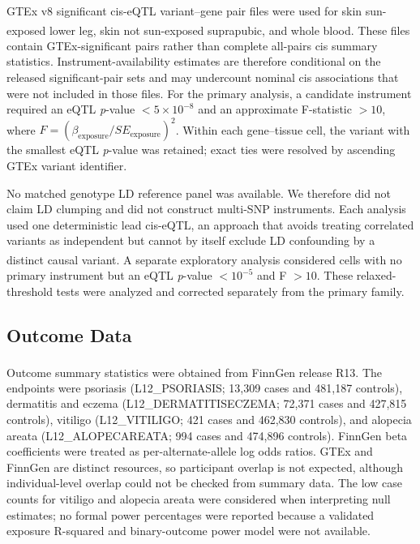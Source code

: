 GTEx v8 significant cis-eQTL variant--gene pair files were used for skin sun-exposed lower leg, skin not sun-exposed suprapubic, and whole blood.\textsuperscript{\cite{gtex2020}} These files contain GTEx-significant pairs rather than complete all-pairs cis summary statistics. Instrument-availability estimates are therefore conditional on the released significant-pair sets and may undercount nominal cis associations that were not included in those files. For the primary analysis, a candidate instrument required an eQTL \textit{p}-value $<5\times10^{-8}$ and an approximate F-statistic $>10$, where $F=(\beta_{\mathrm{exposure}}/SE_{\mathrm{exposure}})^2$.\textsuperscript{\cite{burgess2011weak}} Within each gene--tissue cell, the variant with the smallest eQTL \textit{p}-value was retained; exact ties were resolved by ascending GTEx variant identifier.

No matched genotype LD reference panel was available. We therefore did not claim LD clumping and did not construct multi-SNP instruments. Each analysis used one deterministic lead cis-eQTL, an approach that avoids treating correlated variants as independent but cannot by itself exclude LD confounding by a distinct causal variant.\textsuperscript{\cite{gkatzionis2022cismr,lin2024cismr}} A separate exploratory analysis considered cells with no primary instrument but an eQTL \textit{p}-value $<10^{-5}$ and F $>10$. These relaxed-threshold tests were analyzed and corrected separately from the primary family.

\subsection*{Outcome Data}

Outcome summary statistics were obtained from FinnGen release R13.\textsuperscript{\cite{kurki2023finngen}} The endpoints were psoriasis (L12\_PSORIASIS; 13,309 cases and 481,187 controls), dermatitis and eczema (L12\_DERMATITISECZEMA; 72,371 cases and 427,815 controls), vitiligo (L12\_VITILIGO; 421 cases and 462,830 controls), and alopecia areata (L12\_ALOPECAREATA; 994 cases and 474,896 controls). FinnGen beta coefficients were treated as per-alternate-allele log odds ratios. GTEx and FinnGen are distinct resources, so participant overlap is not expected, although individual-level overlap could not be checked from summary data. The low case counts for vitiligo and alopecia areata were considered when interpreting null estimates; no formal power percentages were reported because a validated exposure R-squared and binary-outcome power model were not available.

